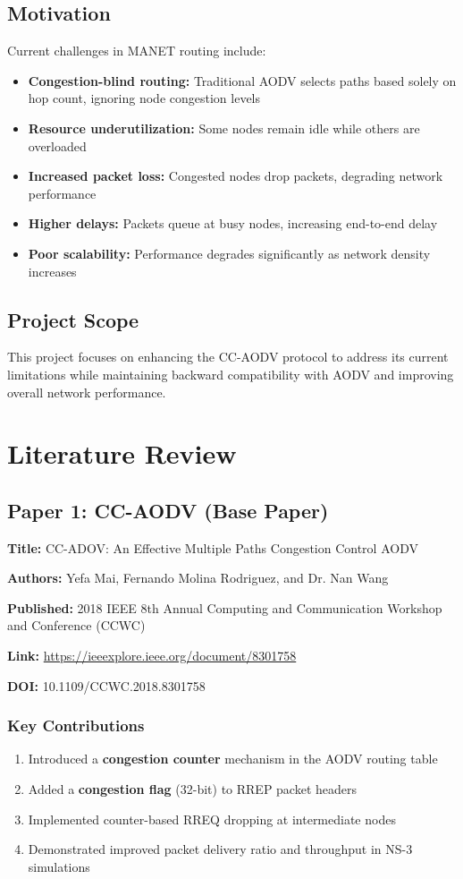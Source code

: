 \documentclass[12pt,a4paper]{article}
\begin{document}
\subsection{Motivation}
Current challenges in MANET routing include:
\begin{itemize}
    \item \textbf{Congestion-blind routing:} Traditional AODV selects paths based solely on hop count, ignoring node congestion levels
    \item \textbf{Resource underutilization:} Some nodes remain idle while others are overloaded
    \item \textbf{Increased packet loss:} Congested nodes drop packets, degrading network performance
    \item \textbf{Higher delays:} Packets queue at busy nodes, increasing end-to-end delay
    \item \textbf{Poor scalability:} Performance degrades significantly as network density increases
\end{itemize}

\subsection{Project Scope}
This project focuses on enhancing the CC-AODV protocol to address its current limitations while maintaining backward compatibility with AODV and improving overall network performance.

\section{Literature Review}

\subsection{Paper 1: CC-AODV (Base Paper)}

\textbf{Title:} CC-ADOV: An Effective Multiple Paths Congestion Control AODV

\textbf{Authors:} Yefa Mai, Fernando Molina Rodriguez, and Dr. Nan Wang

\textbf{Published:} 2018 IEEE 8th Annual Computing and Communication Workshop and Conference (CCWC)

\textbf{Link:} \url{https://ieeexplore.ieee.org/document/8301758}

\textbf{DOI:} 10.1109/CCWC.2018.8301758

\subsubsection{Key Contributions}
\begin{enumerate}
    \item Introduced a \textbf{congestion counter} mechanism in the AODV routing table
    \item Added a \textbf{congestion flag} (32-bit) to RREP packet headers
    \item Implemented counter-based RREQ dropping at intermediate nodes
    \item Demonstrated improved packet delivery ratio and throughput in NS-3 simulations
\end{enumerate}
\end{document}

